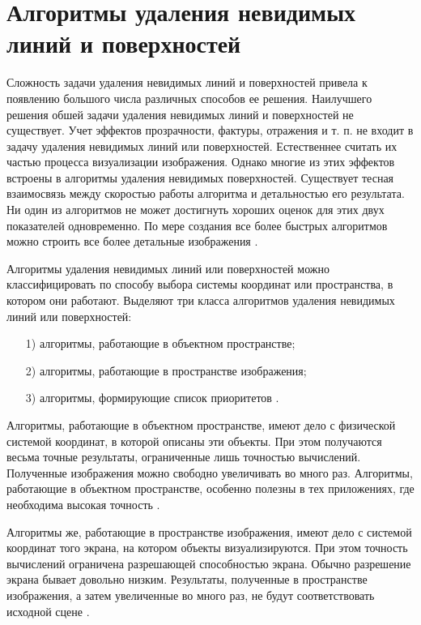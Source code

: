 \section{Алгоритмы удаления невидимых линий и поверхностей}
\label{sec:z_buffer}

Сложность задачи удаления невидимых линий и поверхностей привела к появлению большого числа различных способов ее решения. 
Наилучшего решения обшей задачи удаления невидимых линий и поверхностей не существует. 
Учет эффектов прозрачности, фактуры, отражения и т. п. не входит в задачу удаления невидимых линий или поверхностей. 
Естественнее считать их частью процесса визуализации изображения. 
Однако многие из этих эффектов встроены в алгоритмы удаления невидимых поверхностей. 
Существует тесная взаимосвязь между скоростью работы алгоритма и детальностью его результата. 
Ни один из алгоритмов не может достигнуть хороших оценок для этих двух показателей одновременно. 
По мере создания все более быстрых алгоритмов можно строить все более детальные изображения \cite{Demin2005}.

Алгоритмы удаления невидимых линий или поверхностей можно классифицировать по способу выбора системы координат или пространства, в котором они работают. Выделяют три класса алгоритмов удаления невидимых линий или поверхностей:

\begin{enumerate}
\item[1)]
алгоритмы, работающие в объектном пространстве;
\item[2)]
алгоритмы, работающие в пространстве изображения;
\item[3)]
алгоритмы, формирующие список приоритетов \cite{Demin2005}.
\end{enumerate}

Алгоритмы, работающие в объектном пространстве, имеют дело с физической системой координат, в которой описаны эти объекты. 
При этом получаются весьма точные результаты, ограниченные лишь точностью вычислений. 
Полученные изображения можно свободно увеличивать во много раз. 
Алгоритмы, работающие в объектном пространстве, особенно полезны в тех приложениях, где необходима высокая точность \cite{Demin2005}.

Алгоритмы же, работающие в пространстве изображения, имеют дело с системой координат того экрана, на котором объекты визуализируются. 
При этом точность вычислений ограничена разрешающей способностью экрана. Обычно разрешение экрана бывает довольно низким. 
Результаты, полученные в пространстве изображения, а затем увеличенные во много раз, не будут соответствовать исходной сцене \cite{Demin2005}.

